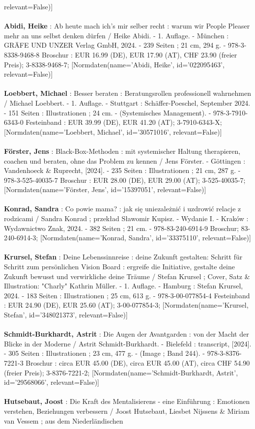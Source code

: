 \documentclass{article}
\begin{document}
\begin{multicols}{3}
relevant=False)]\\\\\textbf{Abidi, Heike} : Ab heute mach ich's mir selber recht : warum wir People Pleaser mehr an uns selbst denken dürfen / Heike Abidi. - 1. Auflage. - München : GRÄFE UND UNZER Verlag GmbH, 2024. - 239 Seiten ; 21 cm, 294 g. - 978-3-8338-9468-8 Broschur : EUR 16.99 (DE), EUR 17.90 (AT), CHF 23.90 (freier Preis); 3-8338-9468-7; [Normdaten(name='Abidi, Heike', id='022095463', relevant=False)]\\\\\textbf{Loebbert, Michael} : Besser beraten : Beratungsrollen professionell wahrnehmen / Michael Loebbert. - 1. Auflage. - Stuttgart : Schäffer-Poeschel, September 2024. - 151 Seiten : Illustrationen ; 24 cm. - (Systemisches Management). - 978-3-7910-6343-0 Festeinband : EUR 39.99 (DE), EUR 41.20 (AT); 3-7910-6343-X; [Normdaten(name='Loebbert, Michael', id='30571016', relevant=False)]\\\\\textbf{Förster, Jens} : Black-Box-Methoden : mit systemischer Haltung therapieren, coachen und beraten, ohne das Problem zu kennen / Jens Förster. - Göttingen : Vandenhoeck \& Ruprecht, [2024]. - 235 Seiten : Illustrationen ; 21 cm, 287 g. - 978-3-525-40035-7 Broschur : EUR 28.00 (DE), EUR 29.00 (AT); 3-525-40035-7; [Normdaten(name='Förster, Jens', id='15397051', relevant=False)]\\\\\textbf{Konrad, Sandra} : Co powie mama? : jak się uniezależnić i uzdrowić relacje z rodzicami / Sandra Konrad ; przekład Sławomir Kupisz. - Wydanie I. - Kraków : Wydawnictwo Znak, 2024. - 382 Seiten ; 21 cm. - 978-83-240-6914-9 Broschur; 83-240-6914-3; [Normdaten(name='Konrad, Sandra', id='33375110', relevant=False)]\\\\\textbf{Krursel, Stefan} : Deine Lebenssinnreise : deine Zukunft gestalten: Schritt für Schritt zum persönlichen Vision Board : ergreife die Initiative, gestalte deine Zukunft bewusst und verwirkliche deine Träume / Stefan Krursel ; Cover, Satz \& Illustration: "Charly" Kathrin Müller. - 1. Auflage. - Hamburg : Stefan Krursel, 2024. - 183 Seiten : Illustrationen ; 25 cm, 613 g. - 978-3-00-077854-4 Festeinband : EUR 24.90 (DE), EUR 25.60 (AT); 3-00-077854-3; [Normdaten(name='Krursel, Stefan', id='348021373', relevant=False)]\\\\\textbf{Schmidt-Burkhardt, Astrit} : Die Augen der Avantgarden : von der Macht der Blicke in der Moderne / Astrit Schmidt-Burkhardt. - Bielefeld : transcript, [2024]. - 305 Seiten : Illustrationen ; 23 cm, 477 g. - (Image ; Band 244). - 978-3-8376-7221-3 Broschur : circa EUR 45.00 (DE), circa EUR 45.00 (AT), circa CHF 54.90 (freier Preis); 3-8376-7221-2; [Normdaten(name='Schmidt-Burkhardt, Astrit', id='29568066', relevant=False)]\\\\\textbf{Hutsebaut, Joost} : Die Kraft des Mentalisierens - eine Einführung : Emotionen verstehen, Beziehungen verbessern / Joost Hutsebaut, Liesbet Nijssens \& Miriam van Vessem ; aus dem Niederländischen 
\end{multicols}
\end{document}
